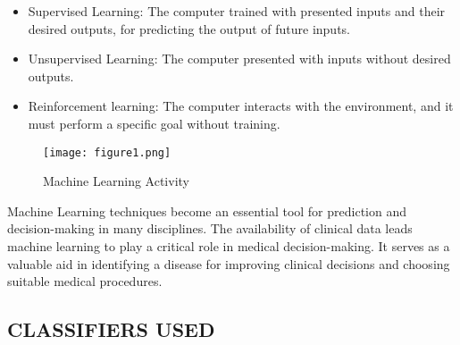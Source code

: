 \documentclass[twocolumn]{article}
\begin{document}
\begin{itemize}
\item Supervised Learning: The computer trained with presented inputs and  their desired outputs, for predicting the output of future inputs. 
\item Unsupervised Learning: The computer presented with inputs without desired outputs. 
\item Reinforcement learning: The computer interacts with the environment, and it must perform a specific goal without training. 
\end{itemize}

\begin{figure}[ht]
\centering
\texttt{[image: figure1.png]}
\label{mlactivity}
\caption{Machine Learning Activity}
\end{figure}


Machine Learning techniques become an essential tool for prediction and decision-making in many disciplines. The availability of clinical data leads machine learning to play a critical role in medical decision-making. It serves as a valuable aid in identifying a disease for improving clinical decisions and choosing suitable medical procedures.

\begin{center}
\section{CLASSIFIERS USED}
\end{center}
\end{document}

